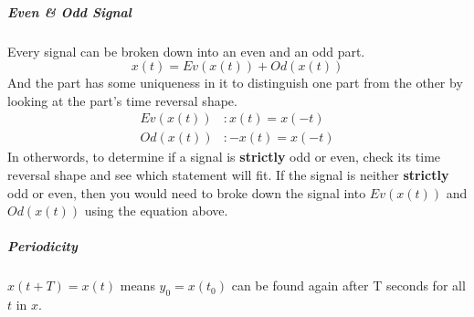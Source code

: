 \subparagraph*{Even \& Odd Signal} Every signal can be broken down into an even and an odd part.
$$x(t) = Ev(x(t)) + Od(x(t))$$
And the part has some uniqueness in it to distinguish one part from the other by looking at the part's time reversal shape.
\begin{align*}
    Ev(x(t))&: x(t) = x(-t) \\
    Od(x(t))&: -x(t) = x(-t)
\end{align*}
In otherwords, to determine if a signal is \textbf{strictly} odd or even, check its time reversal shape and see which statement will fit. If the signal is neither \textbf{strictly} odd or even, then you would need to broke down the signal into $Ev(x(t))$ and $Od(x(t))$ using the equation above.

\subparagraph*{Periodicity} $x(t+T) = x(t)$ means $y_0 = x(t_0)$ can be found again after T seconds for all $t$ in $x$.
